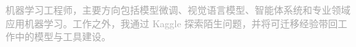 \textcolor{darkgray}{机器学习工程师，主要方向包括模型微调、视觉语言模型、智能体系统和专业领域应用机器学习。工作之外，我通过 Kaggle 探索陌生问题，并将可迁移经验带回工作中的模型与工具建设。}
